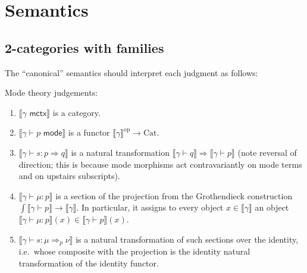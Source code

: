 \documentclass[10pt]{article}
\theoremstyle{definition}
\newcommand{\yields}{\vdash}
\newcommand{\tcell}{\Rightarrow}
\newcommand{\ctx}{\,\,\mathsf{mctx}}
\newcommand{\type}{\,\,\mathsf{mode}}
\newcommand\UE[2]{\ensuremath{#1(#2)}}
\newcommand\UI[2]{\ensuremath{\lambda #1.#2}}
\newcommand\St[2]{\ensuremath{{#1}^*(#2)}}
\newcommand\StI[2]{\ensuremath{\mathsf{st}_{#1}(#2)}}
\newcommand\StE[4]{\ensuremath{\mathsf{let} \, \StI{#1}{#3} \, = \, {#2} \, \mathsf{in} \, #4}}
\newcommand\TypeTwo[4]{\ensuremath{#1 \vdash #2 :  #3 \tcell #4}}
\newcommand\TermTwoT[5]{\ensuremath{#1 \vdash {#2} : #3 \tcell_{#5} #4}}
\newcommand\TrPlus[2]{\ensuremath{{#1}^+(#2)}}
\newcommand\ApEl[2]{\mathcal{T}_{#1}\langle#2\rangle}
\newcommand{\upstairs}[1]{\overline{#1}}
\newcommand\proj[1]{\ensuremath{\mathsf{proj}_{#1}}}
\newcommand\mm[1]{\llbracket #1 \rrbracket}
\newcommand\op{^{\mathrm{op}}}
\newcommand\Cat{\mathrm{Cat}}
\begin{document}
%

\section{Semantics}
\label{sec:semantics}

\subsection{2-categories with families}
\label{sec:2cwfs}

The ``canonical'' semantics should interpret each judgment as follows:

Mode theory judgements:
\begin{enumerate}
\item $\mm{\gamma \ctx}$ is a category.
\item $\mm{\gamma \yields p \type}$ is a functor $\mm{\gamma}\op \to \Cat$.
\item $\mm{\TypeTwo{\gamma}{s}{p}{q}}$ is a natural transformation $\mm{\gamma \yields q} \Rightarrow \mm{\gamma \yields p}$ (note reversal of direction; this is because mode morphisms act contravariantly on mode terms and on upstairs subscripts).
\item $\mm{\gamma \yields \mu : p}$ is a section of the projection from the Grothendieck construction $\int\mm{\gamma\yields p} \to \mm{\gamma}$.
  In particular, it assigns to every object $x\in \mm{\gamma}$ an object $\mm{\gamma \yields \mu : p}(x)\in \mm{\gamma\yields p}(x)$.
\item $\mm{\TermTwoT{\gamma}{s}{\mu}{\nu}{p}}$ is a natural transformation of such sections over the identity, i.e.\ whose composite with the projection is the identity natural transformation of the identity functor.
\end{enumerate}
\end{document}
